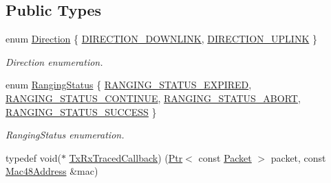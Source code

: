 \subsection*{Public Types}
\begin{DoxyCompactItemize}
\item 
enum \hyperlink{classns3_1_1WimaxNetDevice_a194b6cf7eb59582328eb2531dc9ed884}{Direction} \{ \hyperlink{classns3_1_1WimaxNetDevice_a194b6cf7eb59582328eb2531dc9ed884a5873dae7c36e21d904ae2d6922835e89}{D\+I\+R\+E\+C\+T\+I\+O\+N\+\_\+\+D\+O\+W\+N\+L\+I\+NK}, 
\hyperlink{classns3_1_1WimaxNetDevice_a194b6cf7eb59582328eb2531dc9ed884ad37a477621d1df190ff8d8fb933349cd}{D\+I\+R\+E\+C\+T\+I\+O\+N\+\_\+\+U\+P\+L\+I\+NK}
 \}\begin{DoxyCompactList}\small\item\em Direction enumeration. \end{DoxyCompactList}
\item 
enum \hyperlink{classns3_1_1WimaxNetDevice_a2a74c0f01e51abc1851a630242e7b591}{Ranging\+Status} \{ \hyperlink{classns3_1_1WimaxNetDevice_a2a74c0f01e51abc1851a630242e7b591acae9ed40177eb3ef7d75f27abf9c9e45}{R\+A\+N\+G\+I\+N\+G\+\_\+\+S\+T\+A\+T\+U\+S\+\_\+\+E\+X\+P\+I\+R\+ED}, 
\hyperlink{classns3_1_1WimaxNetDevice_a2a74c0f01e51abc1851a630242e7b591ace0a03105b6d7cf2c6ec79e9789dc3a6}{R\+A\+N\+G\+I\+N\+G\+\_\+\+S\+T\+A\+T\+U\+S\+\_\+\+C\+O\+N\+T\+I\+N\+UE}, 
\hyperlink{classns3_1_1WimaxNetDevice_a2a74c0f01e51abc1851a630242e7b591af8ad5e66165cedeaf588275f529a4a98}{R\+A\+N\+G\+I\+N\+G\+\_\+\+S\+T\+A\+T\+U\+S\+\_\+\+A\+B\+O\+RT}, 
\hyperlink{classns3_1_1WimaxNetDevice_a2a74c0f01e51abc1851a630242e7b591a2a48f503c20971a1a5901af0b6d0746c}{R\+A\+N\+G\+I\+N\+G\+\_\+\+S\+T\+A\+T\+U\+S\+\_\+\+S\+U\+C\+C\+E\+SS}
 \}\begin{DoxyCompactList}\small\item\em Ranging\+Status enumeration. \end{DoxyCompactList}
\item 
typedef void($\ast$ \hyperlink{classns3_1_1WimaxNetDevice_a535e69392034f55156a354580076bac5}{Tx\+Rx\+Traced\+Callback}) (\hyperlink{classns3_1_1Ptr}{Ptr}$<$ const \hyperlink{classns3_1_1Packet}{Packet} $>$ packet, const \hyperlink{classns3_1_1Mac48Address}{Mac48\+Address} \&mac)
\end{DoxyCompactItemize}
